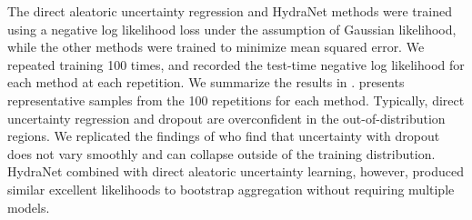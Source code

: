  

The direct aleatoric uncertainty regression and HydraNet methods were trained using a negative log likelihood loss under the assumption of Gaussian likelihood, while the other methods were trained to minimize mean squared error.
We repeated training 100 times, and recorded the test-time negative log likelihood for each method at each repetition.  We summarize the results in .    presents representative samples from the 100 repetitions for each method.  Typically, direct uncertainty regression and dropout are overconfident in the out-of-distribution regions. We replicated the findings of \citep{Osband2016} who find that uncertainty with dropout does not vary smoothly and can collapse outside of the training distribution. HydraNet combined with direct aleatoric uncertainty learning, however, produced similar excellent likelihoods to bootstrap aggregation without requiring multiple models.

